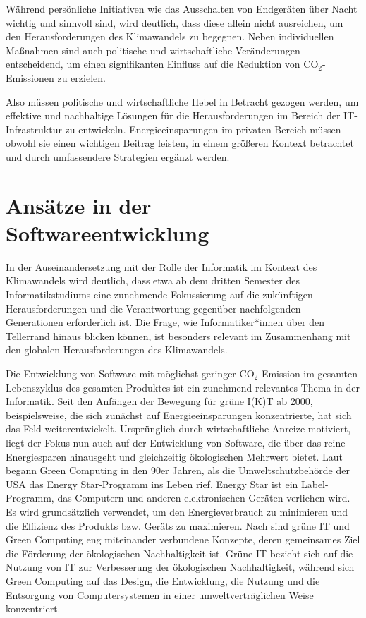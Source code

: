 \documentclass{article}
\begin{document}
 Während persönliche Initiativen wie das Ausschalten von Endgeräten über Nacht wichtig und sinnvoll sind, wird deutlich, dass diese allein nicht ausreichen, um den Herausforderungen des Klimawandels zu begegnen. Neben individuellen Maßnahmen sind auch politische und wirtschaftliche Veränderungen entscheidend, um einen signifikanten Einfluss auf die Reduktion von CO$_2$-Emissionen zu erzielen.

Also müssen   politische und wirtschaftliche Hebel in Betracht gezogen werden, um effektive und nachhaltige Lösungen für die Herausforderungen im Bereich der IT-Infrastruktur zu entwickeln. 
Energieeinsparungen im privaten Bereich müssen  obwohl sie einen wichtigen Beitrag leisten, in einem größeren Kontext betrachtet und durch umfassendere Strategien ergänzt werden.





\section{Ansätze in der Softwareentwicklung}
In der Auseinandersetzung mit der Rolle der Informatik im Kontext des Klimawandels wird deutlich, dass etwa ab dem dritten Semester des Informatikstudiums eine zunehmende Fokussierung auf die zukünftigen Herausforderungen und die Verantwortung gegenüber nachfolgenden Generationen erforderlich ist. Die Frage, wie Informatiker*innen  über den Tellerrand hinaus blicken können, ist besonders relevant im Zusammenhang mit den globalen Herausforderungen des Klimawandels.

Die Entwicklung von Software mit möglichst geringer CO$_2$-Emission im gesamten  Lebenszyklus des gesamten Produktes ist ein zunehmend relevantes Thema in der Informatik. Seit den Anfängen der Bewegung für grüne I(K)T  ab 2000, beispielsweise\cite{murugesan_harnessing_2008,uddin_energy_2012}, die sich zunächst auf Energieeinsparungen konzentrierte, hat sich das Feld weiterentwickelt. Ursprünglich durch wirtschaftliche Anreize motiviert, liegt der Fokus nun auch auf der Entwicklung von Software, die über das reine Energiesparen hinausgeht und gleichzeitig ökologischen Mehrwert bietet. Laut \cite{singh_green_2016} begann
\glqq Green  Computing\grqq{}  in den 90er Jahren, als die Umweltschutzbehörde der USA das Energy Star-Programm ins Leben rief. Energy Star ist ein Label-Programm, das Computern und anderen elektronischen Geräten verliehen wird. Es wird grundsätzlich verwendet, um den Energieverbrauch zu minimieren und die Effizienz des Produkts bzw. Geräts zu maximieren. Nach \cite{paul_comprehensive_2023} sind grüne IT und Green  Computing eng miteinander verbundene Konzepte, deren gemeinsames Ziel die Förderung der ökologischen Nachhaltigkeit ist. Grüne IT bezieht sich auf die Nutzung von IT zur Verbesserung der ökologischen Nachhaltigkeit, während sich Green Computing auf das Design, die Entwicklung, die Nutzung und die Entsorgung von Computersystemen in einer umweltverträglichen Weise konzentriert.
\end{document}
